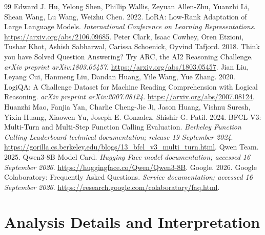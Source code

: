 \documentclass[10pt,twocolumn]{article}
\begin{document}
\begin{thebibliography}{99}
Edward J. Hu, Yelong Shen, Phillip Wallis, Zeyuan Allen-Zhu, Yuanzhi Li, Shean Wang, Lu Wang, Weizhu Chen. 2022. LoRA: Low-Rank Adaptation of Large Language Models. \emph{International Conference on Learning Representations}. \url{https://arxiv.org/abs/2106.09685}.
Peter Clark, Isaac Cowhey, Oren Etzioni, Tushar Khot, Ashish Sabharwal, Carissa Schoenick, Oyvind Tafjord. 2018. Think you have Solved Question Answering? Try ARC, the AI2 Reasoning Challenge. \emph{arXiv preprint arXiv:1803.05457}. \url{https://arxiv.org/abs/1803.05457}.
Jian Liu, Leyang Cui, Hanmeng Liu, Dandan Huang, Yile Wang, Yue Zhang. 2020. LogiQA: A Challenge Dataset for Machine Reading Comprehension with Logical Reasoning. \emph{arXiv preprint arXiv:2007.08124}. \url{https://arxiv.org/abs/2007.08124}.
Huanzhi Mao, Fanjia Yan, Charlie Cheng-Jie Ji, Jason Huang, Vishnu Suresh, Yixin Huang, Xiaowen Yu, Joseph E. Gonzalez, Shishir G. Patil. 2024. BFCL V3: Multi-Turn and Multi-Step Function Calling Evaluation. \emph{Berkeley Function Calling Leaderboard technical documentation; release 19 September 2024}. \url{https://gorilla.cs.berkeley.edu/blogs/13_bfcl_v3_multi_turn.html}.
Qwen Team. 2025. Qwen3-8B Model Card. \emph{Hugging Face model documentation; accessed 16 September 2026}. \url{https://huggingface.co/Qwen/Qwen3-8B}.
Google. 2026. Google Colaboratory: Frequently Asked Questions. \emph{Service documentation; accessed 16 September 2026}. \url{https://research.google.com/colaboratory/faq.html}.
\end{thebibliography}
\endgroup

\clearpage
\appendix
\onecolumn
\section{Analysis Details and Interpretation}
\label{app:analysis}
\end{document}

